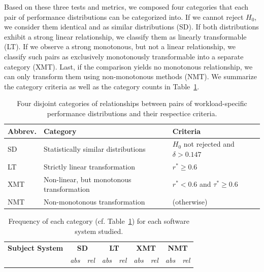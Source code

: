{\color{black} Based on these three tests and metrics, we composed four categories that each pair of performance distributions can be categorized into. If we cannot reject $H_0$, we consider them identical and as similar distributions (\textsf{\colorbox{cs-color}{SD}}). If both distributions exhibit a strong linear relationship, we classify them as linearly transformable (\textsf{\colorbox{lt-color}{LT}}). If we observe a strong monotonous, but not a linear relationship, we classify such pairs as exclusively monotonously transformable into a separate category (\textsf{\colorbox{xmt-color}{XMT}}). Last, if the comparison yields no monotonous relationship, we can only transform them using non-monotonous methods (\textsf{\colorbox{nmt-color}{NMT}}). We summarize the category criteria as well as the category counts in Table~\ref{tab:categorization}. 

\begin{table}
	\footnotesize
	\caption{Four disjoint categories of relationships between pairs of workload-specific performance distributions and their respectice criteria.}
	\centering
\begin{tabular*}{\linewidth}{lp{3.8cm}p{3cm}}	
	\toprule
	 \textbf{Abbrev.} & \textbf{Category} & \textbf{Criteria}\\
	 \midrule
	 \cellcolor{cs-color}\textsf{SD} & {Statistically similar distributions} & {$H_0$ not rejected} and $\delta > 0.147$ \\
	 \cellcolor{lt-color}\textsf{LT} & {Strictly linear transformation} & $r^* \geq 0.6$ \\
	\cellcolor{xmt-color}\textsf{XMT} & {Non-linear, but monotonous transformation} & $r^* < 0.6 $ and $ \tau^* \geq 0.6$ \\
	\cellcolor{nmt-color}\textsf{NMT} & {Non-monotonous transformation}  & (otherwise) \\%
	\bottomrule
\end{tabular*}
\label{tab:categorization}
\end{table}

\begin{table}
	\footnotesize
	\caption{Frequency of each category (cf. Table~\ref{tab:categorization}) for each software system studied.}
\begin{tabular}{lrrrrrrrr}	
	\toprule
	\textbf{Subject System} & \multicolumn{2}{c}{\textbf{\cellcolor{cs-color}\textsf{SD}}} & \multicolumn{2}{c}{\textbf{\cellcolor{lt-color}\textsf{LT}}} & \multicolumn{2}{c}{\textbf{\cellcolor{xmt-color}\textsf{XMT}}} & \multicolumn{2}{c}{\textbf{\cellcolor{nmt-color}\textsf{NMT}}}\\
	 & \textit{abs} & \textit{rel} & \textit{abs} &\textit{rel} & \textit{abs} & \textit{rel}& \textit{abs} & \textit{rel}\\
	\midrule
	

\end{tabular}
\end{table}}
